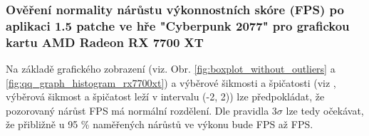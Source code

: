 \subsubsection*{Ověření normality nárůstu výkonnostních skóre (FPS) po aplikaci 1.5 patche ve hře "Cyberpunk 2077" pro grafickou kartu AMD Radeon RX 7700 XT}

Na základě grafického zobrazení (viz. Obr. \ref{fig:boxplot_without_outliers} a \ref{fig:qq_graph_histogram_rx7700xt}) a výběrové šikmosti a špičatosti (viz , výběrová šikmost a špičatost leží
v intervalu (-2, 2)) lze předpokládat, že pozorovaný nárůst FPS má normální rozdělení. Dle pravidla 3$\sigma$
lze tedy očekávat, že přibližně u 95 \% naměřených nárůstů ve výkonu bude  FPS až  FPS\@.

\endinput